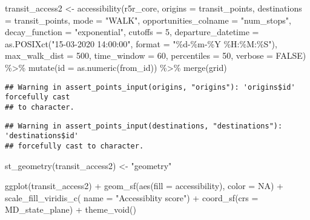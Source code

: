\documentclass[
]{article}
\newenvironment{Shaded}{\begin{snugshade}}{\end{snugshade}}
\newcommand{\AttributeTok}[1]{\textcolor[rgb]{0.77,0.63,0.00}{#1}}
\newcommand{\ConstantTok}[1]{\textcolor[rgb]{0.00,0.00,0.00}{#1}}
\newcommand{\DecValTok}[1]{\textcolor[rgb]{0.00,0.00,0.81}{#1}}
\newcommand{\FunctionTok}[1]{\textcolor[rgb]{0.00,0.00,0.00}{#1}}
\newcommand{\NormalTok}[1]{#1}
\newcommand{\OtherTok}[1]{\textcolor[rgb]{0.56,0.35,0.01}{#1}}
\newcommand{\SpecialCharTok}[1]{\textcolor[rgb]{0.00,0.00,0.00}{#1}}
\newcommand{\StringTok}[1]{\textcolor[rgb]{0.31,0.60,0.02}{#1}}
\begin{document}
\begin{Shaded}
\begin{Highlighting}[]
\NormalTok{transit\_access2 }\OtherTok{\textless{}{-}} \FunctionTok{accessibility}\NormalTok{(r5r\_core,}
                        \AttributeTok{origins =}\NormalTok{ transit\_points,}
                        \AttributeTok{destinations =}\NormalTok{ transit\_points,}
                        \AttributeTok{mode =} \StringTok{"WALK"}\NormalTok{,}
                        \AttributeTok{opportunities\_colname =} \StringTok{"num\_stops"}\NormalTok{,}
                        \AttributeTok{decay\_function =} \StringTok{"exponential"}\NormalTok{,}
                        \AttributeTok{cutoffs =} \DecValTok{5}\NormalTok{,}
                        \AttributeTok{departure\_datetime =} \FunctionTok{as.POSIXct}\NormalTok{(}\StringTok{"15{-}03{-}2020 14:00:00"}\NormalTok{,}
                                 \AttributeTok{format =} \StringTok{"\%d{-}\%m{-}\%Y \%H:\%M:\%S"}\NormalTok{),}
                        \AttributeTok{max\_walk\_dist =} \DecValTok{500}\NormalTok{,}
                        \AttributeTok{time\_window =} \DecValTok{60}\NormalTok{,}
                        \AttributeTok{percentiles =} \DecValTok{50}\NormalTok{,}
                        \AttributeTok{verbose =} \ConstantTok{FALSE}\NormalTok{) }\SpecialCharTok{\%\textgreater{}\%}
  \FunctionTok{mutate}\NormalTok{(}\AttributeTok{id =} \FunctionTok{as.numeric}\NormalTok{(from\_id)) }\SpecialCharTok{\%\textgreater{}\%}
  \FunctionTok{merge}\NormalTok{(grid)}
\end{Highlighting}
\end{Shaded}

\begin{verbatim}
## Warning in assert_points_input(origins, "origins"): 'origins$id' forcefully cast
## to character.
\end{verbatim}

\begin{verbatim}
## Warning in assert_points_input(destinations, "destinations"): 'destinations$id'
## forcefully cast to character.
\end{verbatim}

\begin{Shaded}
\begin{Highlighting}[]
\FunctionTok{st\_geometry}\NormalTok{(transit\_access2) }\OtherTok{\textless{}{-}} \StringTok{"geometry"}

\FunctionTok{ggplot}\NormalTok{(transit\_access2) }\SpecialCharTok{+}
  \FunctionTok{geom\_sf}\NormalTok{(}\FunctionTok{aes}\NormalTok{(}\AttributeTok{fill =}\NormalTok{ accessibility), }\AttributeTok{color =} \ConstantTok{NA}\NormalTok{) }\SpecialCharTok{+}
  \FunctionTok{scale\_fill\_viridis\_c}\NormalTok{( }\AttributeTok{name =} \StringTok{"Accessiblity score"}\NormalTok{) }\SpecialCharTok{+}
  \FunctionTok{coord\_sf}\NormalTok{(}\AttributeTok{crs =}\NormalTok{ MD\_state\_plane) }\SpecialCharTok{+}
  \FunctionTok{theme\_void}\NormalTok{()}
\end{Highlighting}
\end{Shaded}
\end{document}
